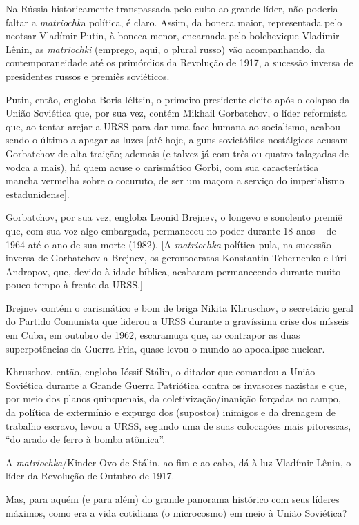 Na Rússia historicamente transpassada pelo culto ao grande líder, não
poderia faltar a \emph{matriochk}a política, é claro. Assim, da boneca
maior, representada pelo neotsar Vladímir Putin, à boneca menor,
encarnada pelo bolchevique Vladímir Lênin, as \emph{matriochki}
(emprego, aqui, o plural russo) vão acompanhando, da contemporaneidade
até os primórdios da Revolução de 1917, a sucessão inversa de
presidentes russos e premiês soviéticos.

Putin, então, engloba Boris Iéltsin, o primeiro presidente eleito após o
colapso da União Soviética que, por sua vez, contém Mikhail Gorbatchov,
o líder reformista que, ao tentar arejar a URSS para dar uma face humana
ao socialismo, acabou sendo o último a apagar as luzes {[}até hoje,
alguns sovietófilos nostálgicos acusam Gorbatchov de alta traição;
ademais (e talvez já com três ou quatro talagadas de vodca a mais), há
quem acuse o carismático Gorbi, com sua característica mancha vermelha
sobre o cocuruto, de ser um maçom a serviço do imperialismo
estadunidense{]}.

Gorbatchov, por sua vez, engloba Leonid Brejnev, o longevo e sonolento
premiê que, com sua voz algo embargada, permaneceu no poder durante 18
anos -- de 1964 até o ano de sua morte (1982). {[}A \emph{matriochka}
política pula, na sucessão inversa de Gorbatchov a Brejnev, os
gerontocratas Konstantin Tchernenko e Iúri Andropov, que, devido à idade
bíblica, acabaram permanecendo durante muito pouco tempo à frente da
URSS.{]}

Brejnev contém o carismático e bom de briga Nikita Khruschov, o
secretário geral do Partido Comunista que liderou a URSS durante a
gravíssima crise dos mísseis em Cuba, em outubro de 1962, escaramuça
que, ao contrapor as duas superpotências da Guerra Fria, quase levou o
mundo ao apocalipse nuclear.

Khruschov, então, engloba Ióssif Stálin, o ditador que comandou a União
Soviética durante a Grande Guerra Patriótica contra os invasores
nazistas e que, por meio dos planos quinquenais, da
coletivização/inanição forçadas no campo, da política de extermínio e
expurgo dos (supostos) inimigos e da drenagem de trabalho escravo, levou
a URSS, segundo uma de suas colocações mais pitorescas, ``do arado de
ferro à bomba atômica''.

A \emph{matriochka}/Kinder Ovo de Stálin, ao fim e ao cabo, dá à luz
Vladímir Lênin, o líder da Revolução de Outubro de 1917.

Mas, para aquém (e para além) do grande panorama histórico com seus
líderes máximos, como era a vida cotidiana (o microcosmo) em meio à
União Soviética?

